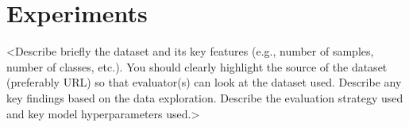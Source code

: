 \section{Experiments}
\label{sec:experiments}

<Describe briefly the dataset and its key features (e.g., number of samples,
number of classes, etc.). You should clearly highlight the source of the
dataset (preferably URL) so that evaluator(s) can look at the dataset used.
Describe any key findings based on the data exploration. Describe the
evaluation strategy used and key model hyperparameters used.>
